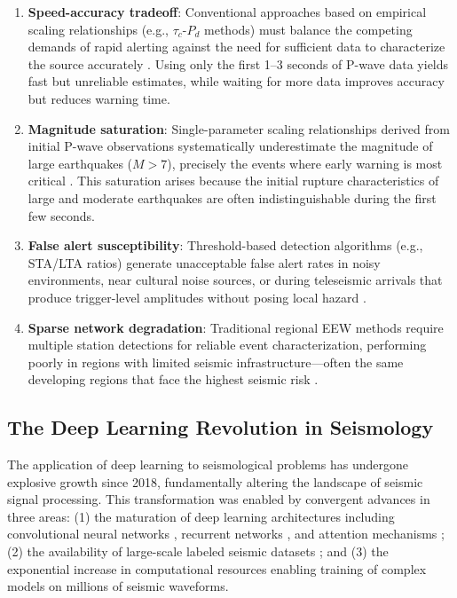 \documentclass[review,authoryear]{elsarticle}
\begin{document}
\begin{enumerate}[label=(\roman*)]
\item \textbf{Speed-accuracy tradeoff}: Conventional approaches based on empirical scaling relationships (e.g., $\tau_c$-$P_d$ methods) must balance the competing demands of rapid alerting against the need for sufficient data to characterize the source accurately \citep{wu2005experiment, wu2006magnitude, satriano2011earthquake}. Using only the first 1--3 seconds of P-wave data yields fast but unreliable estimates, while waiting for more data improves accuracy but reduces warning time.

\item \textbf{Magnitude saturation}: Single-parameter scaling relationships derived from initial P-wave observations systematically underestimate the magnitude of large earthquakes ($M > 7$), precisely the events where early warning is most critical \citep{kuyuk2013global, colombelli2015within}. This saturation arises because the initial rupture characteristics of large and moderate earthquakes are often indistinguishable during the first few seconds.

\item \textbf{False alert susceptibility}: Threshold-based detection algorithms (e.g., STA/LTA ratios) generate unacceptable false alert rates in noisy environments, near cultural noise sources, or during teleseismic arrivals that produce trigger-level amplitudes without posing local hazard \citep{withers1998comparison, allen1978automatic}.

\item \textbf{Sparse network degradation}: Traditional regional EEW methods require multiple station detections for reliable event characterization, performing poorly in regions with limited seismic infrastructure---often the same developing regions that face the highest seismic risk \citep{allen2019earthquake}.
\end{enumerate}

\subsection{The Deep Learning Revolution in Seismology}

The application of deep learning to seismological problems has undergone explosive growth since 2018, fundamentally altering the landscape of seismic signal processing. This transformation was enabled by convergent advances in three areas: (1) the maturation of deep learning architectures including convolutional neural networks \citep{lecun2015deep, krizhevsky2012imagenet, he2016deep}, recurrent networks \citep{hochreiter1997long, cho2014learning}, and attention mechanisms \citep{vaswani2017attention, bahdanau2015attention}; (2) the availability of large-scale labeled seismic datasets \citep{mousavi2019stead, michelini2021instance}; and (3) the exponential increase in computational resources enabling training of complex models on millions of seismic waveforms.
\end{document}
